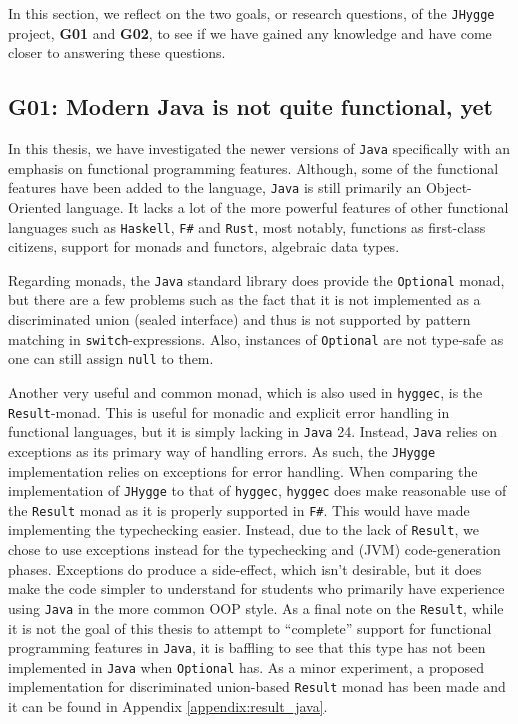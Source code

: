 In this section, we reflect on the two goals, or research questions, of the
\texttt{JHygge} project, \textbf{G01} and \textbf{G02}, to see if we have gained
any knowledge and have come closer to answering these questions.

\subsection{\textbf{G01}: Modern Java is not quite functional, yet}

In this thesis, we have investigated the newer versions of \texttt{Java} specifically with an emphasis on functional programming features.
Although, some of the functional features have been added to the language, \texttt{Java} is still primarily an Object-Oriented language.
It lacks a lot of the more powerful features of other functional languages such as \texttt{Haskell}, \texttt{F\#} and \texttt{Rust},
most notably, functions as first-class citizens, support for monads and functors, algebraic data types.

Regarding monads, the \texttt{Java} standard library does provide the \texttt{Optional} monad, but there are a few problems such as the
fact that it is not implemented as a discriminated union (sealed interface) and thus is not supported by pattern matching in
\texttt{switch}-expressions. Also, instances of \texttt{Optional} are not type-safe as one can still assign \texttt{null} to them.

Another very useful and common monad, which is also used in \texttt{hyggec}, is the \texttt{Result}-monad. This is useful for monadic
and explicit error handling in functional languages, but it is simply lacking in \texttt{Java} 24. Instead, \texttt{Java} relies on
exceptions as its primary way of handling errors. As such, the \texttt{JHygge} implementation relies on exceptions for error handling.
When comparing the implementation of \texttt{JHygge} to that of \texttt{hyggec}, \texttt{hyggec} does make reasonable use of the \texttt{Result}
monad as it is properly supported in \texttt{F\#}. This would have made implementing the typechecking easier. Instead, due to the lack
of \texttt{Result}, we chose to use exceptions instead for the typechecking and (JVM) code-generation phases. Exceptions do produce a
side-effect, which isn't desirable, but it does make the code simpler to understand for students who primarily have experience using
\texttt{Java} in the more common OOP style. As a final note on the \texttt{Result}, while it is not the goal of this thesis to attempt
to ``complete'' support for functional programming features in \texttt{Java}, it is baffling to see that this type has not been implemented
in \texttt{Java} when \texttt{Optional} has. As a minor experiment, a proposed implementation for discriminated union-based \texttt{Result}
monad has been made and it can be found in Appendix \ref{appendix:result_java}.

